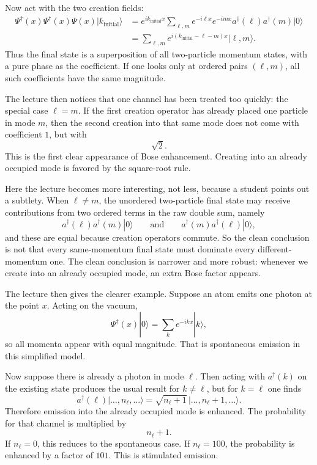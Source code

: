 Now act with the two creation fields:
\begin{align}
\Psi^\dagger(x)\Psi^\dagger(x)\Psi(x)|k_{\mathrm{initial}}\rangle
&=
e^{ik_{\mathrm{initial}}x}
\sum_{\ell,m}
e^{-i\ell x}e^{-imx}
a^\dagger(\ell)a^\dagger(m)|0\rangle
\\
&=
\sum_{\ell,m}
e^{i(k_{\mathrm{initial}}-\ell-m)x}
|\ell,m\rangle.
\end{align}
Thus the final state is a superposition of all two-particle momentum states, with a pure phase as the coefficient. If one looks only at ordered pairs \((\ell,m)\), all such coefficients have the same magnitude.

The lecture then notices that one channel has been treated too quickly: the special case \(\ell=m\). If the first creation operator has already placed one particle in mode \(m\), then the second creation into that same mode does not come with coefficient \(1\), but with
\begin{equation}
\sqrt{2}.
\end{equation}
This is the first clear appearance of Bose enhancement. Creating into an already occupied mode is favored by the square-root rule.

Here the lecture becomes more interesting, not less, because a student points out a subtlety. When \(\ell\neq m\), the unordered two-particle final state may receive contributions from two ordered terms in the raw double sum, namely
\begin{equation}
a^\dagger(\ell)a^\dagger(m)|0\rangle
\qquad\text{and}\qquad
a^\dagger(m)a^\dagger(\ell)|0\rangle,
\end{equation}
and these are equal because creation operators commute. So the clean conclusion is not that every same-momentum final state must dominate every different-momentum one. The clean conclusion is narrower and more robust: whenever we create into an already occupied mode, an extra Bose factor appears.

The lecture then gives the clearer example. Suppose an atom emits one photon at the point \(x\). Acting on the vacuum,
\begin{equation}
\Psi^\dagger(x)|0\rangle
=
\sum_k e^{-ikx}|k\rangle,
\end{equation}
so all momenta appear with equal magnitude. That is spontaneous emission in this simplified model.

Now suppose there is already a photon in mode \(\ell\). Then acting with \(a^\dagger(k)\) on the existing state produces the usual result for \(k\neq \ell\), but for \(k=\ell\) one finds
\begin{equation}
a^\dagger(\ell)\big|\ldots,n_\ell,\ldots\big\rangle
=
\sqrt{n_\ell+1}\,
\big|\ldots,n_\ell+1,\ldots\big\rangle.
\end{equation}
Therefore emission into the already occupied mode is enhanced. The probability for that channel is multiplied by
\begin{equation}
n_\ell+1.
\end{equation}
If \(n_\ell=0\), this reduces to the spontaneous case. If \(n_\ell=100\), the probability is enhanced by a factor of \(101\). This is stimulated emission.

